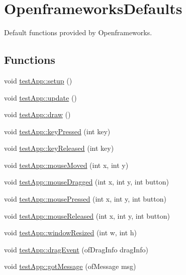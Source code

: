 \hypertarget{group___openframeworks_defaults}{\section{Openframeworks\-Defaults}
\label{group___openframeworks_defaults}
}


Default functions provided by Openframeworks.  


\subsection*{Functions}
\begin{DoxyCompactItemize}
\item 
void \hyperlink{group___openframeworks_defaults_gad431db15b6150b965cd52bcba8e16e11}{test\-App\-::setup} ()
\item 
void \hyperlink{group___openframeworks_defaults_gafb39d201aec71a295b7609876bf7d0c6}{test\-App\-::update} ()
\item 
void \hyperlink{group___openframeworks_defaults_gaf869cba67b1dab8481f8d0e216d59dcd}{test\-App\-::draw} ()
\item 
void \hyperlink{group___openframeworks_defaults_ga904d147c7e532cb92656d5dd4895cd26}{test\-App\-::key\-Pressed} (int key)
\item 
void \hyperlink{group___openframeworks_defaults_ga1116a10088e4932f6d482efe723cd45e}{test\-App\-::key\-Released} (int key)
\item 
void \hyperlink{group___openframeworks_defaults_ga33541b19eff9f8285b2487bfc146d58b}{test\-App\-::mouse\-Moved} (int x, int y)
\item 
void \hyperlink{group___openframeworks_defaults_ga075bcc2be16fd8f3eaa9162fb40a0a1f}{test\-App\-::mouse\-Dragged} (int x, int y, int button)
\item 
void \hyperlink{group___openframeworks_defaults_ga3f200702ce91859cac2872a39302679d}{test\-App\-::mouse\-Pressed} (int x, int y, int button)
\item 
void \hyperlink{group___openframeworks_defaults_gaa3680ffc782b1e5c451289817f20c9c6}{test\-App\-::mouse\-Released} (int x, int y, int button)
\item 
void \hyperlink{group___openframeworks_defaults_ga428b7df9c64352d6e7cb234fc297e6c9}{test\-App\-::window\-Resized} (int w, int h)
\item 
void \hyperlink{group___openframeworks_defaults_gaf15e9e9064fe5ccbe6c82cc401ae9e09}{test\-App\-::drag\-Event} (of\-Drag\-Info drag\-Info)
\item 
void \hyperlink{group___openframeworks_defaults_ga66dbc8c5c2d4e20febebe9fd42b8c851}{test\-App\-::got\-Message} (of\-Message msg)
\end{DoxyCompactItemize}


